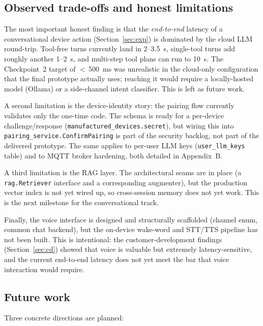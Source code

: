 \documentclass[a4paper,12pt]{article}
\begin{document}
\subsection{Observed trade-offs and honest limitations}

The most important honest finding is that the \emph{end-to-end} latency of a conversational device action (Section~\ref{sec:exp}) is dominated by the cloud LLM round-trip. Tool-free turns currently land in 2--3.5~s, single-tool turns add roughly another 1--2~s, and multi-step tool plans can run to 10~s. The Checkpoint~2 target of $<\,$500~ms was unrealistic in the cloud-only configuration that the final prototype actually uses; reaching it would require a locally-hosted model (Ollama) or a side-channel intent classifier. This is left as future work.

A second limitation is the device-identity story: the pairing flow currently validates only the one-time code. The schema is ready for a per-device challenge/response (\verb|manufactured_devices.secret|), but wiring this into \verb|pairing_service.ConfirmPairing| is part of the security backlog, not part of the delivered prototype. The same applies to per-user LLM keys (\verb|user_llm_keys| table) and to MQTT broker hardening, both detailed in Appendix~B.

A third limitation is the RAG layer. The architectural seams are in place (a \verb|rag.Retriever| interface and a corresponding augmenter), but the production vector index is not yet wired up, so cross-session memory does not yet work. This is the next milestone for the conversational track.

Finally, the voice interface is designed and structurally scaffolded (channel enum, common chat backend), but the on-device wake-word and STT/TTS pipeline has not been built. This is intentional: the customer-development findings (Section~\ref{sec:cd}) showed that voice is valuable but extremely latency-sensitive, and the current end-to-end latency does not yet meet the bar that voice interaction would require.

\subsection{Future work}

Three concrete directions are planned:
\end{document}
